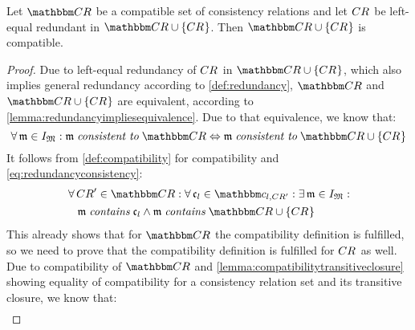 \begin{theorem} \label{theorem:redundancycompatibility}
    Let $\consistencyrelationset{CR}$ be a compatible set of consistency relations and let $\consistencyrelation{CR}{}$ be left-equal redundant in $\consistencyrelationset{CR} \cup \setted{\consistencyrelation{CR}{}}$. Then $\consistencyrelationset{CR} \cup \setted{\consistencyrelation{CR}{}}$ is compatible. 
\end{theorem}
%
\begin{proof}
    Due to left-equal redundancy of $\consistencyrelation{CR}{}$ in $\consistencyrelationset{CR} \cup \setted{\consistencyrelation{CR}{}}$, which also implies general redundancy according to \autoref{def:redundancy}, $\consistencyrelationset{CR}$ and $\consistencyrelationset{CR} \cup \setted{\consistencyrelation{CR}{}}$ are equivalent, according to \autoref{lemma:redundancyimpliesequivalence}.
    Due to that equivalence, we know that:
    \begin{equation} \label{eq:redundancyconsistency}
        \forall \modeltuple{m} \in \metamodeltupleinstanceset{M}: \modeltuple{m} \consistenttomath \consistencyrelationset{CR} \equivalent     \modeltuple{m} \consistenttomath \consistencyrelationset{CR} \cup \setted{\consistencyrelation{CR}{}}
    \end{equation}
    It follows from \autoref{def:compatibility} for compatibility and \autoref{eq:redundancyconsistency}:
    \begin{align} \label{eq:redundancycompatibleexisting}
        & \nonumber
        \forall \consistencyrelation{CR}{}' \in \consistencyrelationset{CR} : \forall \conditionelement{c}{l} \in \condition{c}{l, \consistencyrelation{CR}{}'}
        : \exists \modeltuple{m} \in \metamodeltupleinstanceset{M} : \\
        & \formulaskip
        \modeltuple{m} \containsmath \conditionelement{c}{l} \land \modeltuple{m} \containsmath \consistencyrelationset{CR} \cup \setted{\consistencyrelation{CR}{}}
    \end{align}
    This already shows that for $\consistencyrelationset{CR}$ the compatibility definition is fulfilled, so we need to prove that the compatibility definition is fulfilled for $\consistencyrelation{CR}{}$ as well.
    Due to compatibility of $\consistencyrelationset{CR}$ and \autoref{lemma:compatibilitytransitiveclosure} showing equality of compatibility for a consistency relation set and its transitive closure, we know that:
    \begin{align} \label{eq:compatibilityclosure}

\end{align}
\end{proof}
